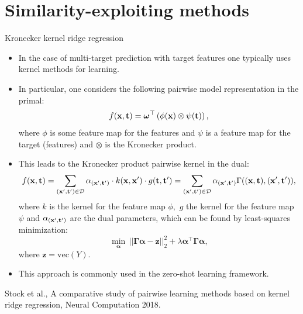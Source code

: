 \documentclass[11pt,compress,t,notes=noshow, xcolor=table]{beamer}
\newcommand{\tv}{\mathbf{t}}
\begin{document}
\section{Similarity-exploiting methods}


\begin{frame}{Kronecker kernel ridge regression}
	\footnotesize
	\begin{itemize}
%		
	\item In the case of multi-target prediction with target features one typically uses kernel methods for learning.
%		
	\item In particular, one considers the following pairwise model representation in the primal: 
		\begin{equation*}
			\label{eq:pairwise}
			f(\xv,\tv) = \bm\omega^\top \left(\phi(\xv) \otimes \psi(\tv) \right) ,
		\end{equation*}
%	
	where $\phi$ is some feature map for the features and $\psi$ is a feature map for the target (features) and $\otimes$ is the Kronecker product.
%
	\item This leads to the Kronecker product pairwise kernel in the dual:
%	
	\begin{eqnarray*} 
		f(\xv,\tv)= \sum_{(\xv',\tv') \in \D} \alpha_{(\xv',\tv')}  \cdot  k(\xv,\xv') \cdot g(\tv,\tv')  = \sum_{(\xv',\tv') \in \D} \alpha_{(\xv',\tv')} \Gamma((\xv,\tv),(\xv',\tv')),
	\end{eqnarray*}
%
	where $k$ is the kernel for the feature map $\phi,$  $g$ the kernel for the feature map $\psi$  and $\alpha_{(\xv',\tv')}$ are the dual parameters, which can be found by least-squares minimization:
%	 
	$$ \min_{\bm{\alpha}} \, ||\bm{\Gamma}\bm{\alpha} -\bm{z} ||^2_2 +\lambda\bm{\alpha }^\top \bm{\Gamma}\bm{\alpha}, $$
%	
	where $\bm{z} = \mathrm{vec}{(Y)}.$
%
%
	\item This approach is commonly used in the zero-shot learning framework.

%
\end{itemize}
%	
	{\tiny Stock et al., A comparative study of pairwise learning methods based on kernel ridge regression, Neural Computation 2018.}
%	
\end{frame}
\end{document}
